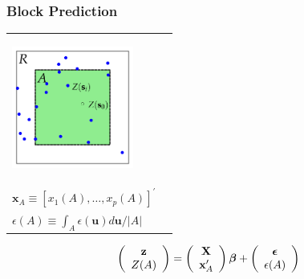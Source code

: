 \documentclass[mathserif,compress]{beamer}\usepackage{graphicx, color}
\def\bu{\mathbf{u}}
\def\bx{\mathbf{x}}
\def\bz{\mathbf{z}}
\def\bX{\mathbf{X}}
\def\bbeta{\mbox{\boldmath $\beta$}}
\def\bepsilon{\mbox{\boldmath $\epsilon$}}
\def\upp{^\prime}
\begin{document}
\begin{frame}[fragile]
\frametitle{Block Prediction}




	\begin{tabular} {p{4cm} p{5cm}}
		\begin{center}
			\vspace{-1cm}
			\includegraphics[width=4cm]{figure/BlockPred-plot} 
		\end{center} &
		\begin{itemize}
			\item $Z(A) \equiv \int_{A} Z(\bu) d\bu/|A|$
			\item $x_i(A) \equiv \int_{A} x_i(\bu) d\bu/|A|$ \\
			\item $\bx_A \equiv [x_1(A),\ldots,x_p(A)]\upp$ \\
			\item $\epsilon(A) \equiv \int_{A} \epsilon(\bu) d\bu/|A|$
		\end{itemize}

	\end{tabular}

	\[ 
		\left(\begin{array}{c}
		\bz \\ Z(A)
		\end{array}\right)	=
		\left(\begin{array}{c}
		\bX \\ \bx_A\upp
		\end{array}\right)\bbeta +
		\left(\begin{array}{c}
		\bepsilon \\ \epsilon(A)
		\end{array}\right)
	\]

\end{frame}

\end{document}
